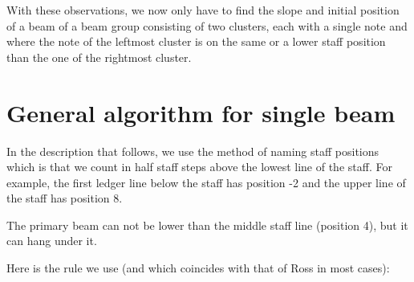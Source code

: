 With these observations, we now only have to find the slope and
initial position of a beam of a beam group consisting of two clusters,
each with a single note and where the note of the leftmost cluster is
on the same or a lower staff position than the one of the rightmost
cluster.  

\section{General algorithm for single beam}

In the description that follows, we use the {\gs} method of naming
staff positions which is that we count in half staff steps above the lowest
line of the staff.  For example, the first ledger line below the staff has
position -2 and the upper line of the staff has position 8. 

The primary beam can not be lower than the middle staff line (position
4), but it can hang under it. 

Here is the rule we use (and which coincides with that of Ross in most
cases):

